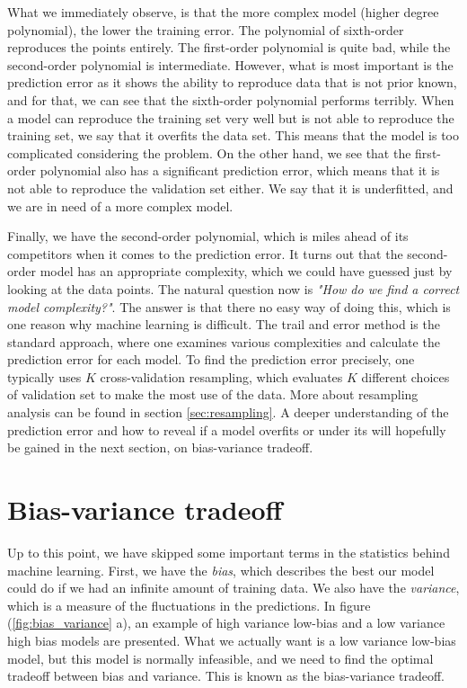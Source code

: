 What we immediately observe, is that the more complex model (higher degree polynomial), the lower the training error. The polynomial of sixth-order reproduces the points entirely. The first-order polynomial is quite bad, while the second-order polynomial is intermediate. However, what is most important is the prediction error as it shows the ability to reproduce data that is not prior known, and for that, we can see that the sixth-order polynomial performs terribly. When a model can reproduce the training set very well but is not able to reproduce the training set, we say that it overfits the data set. This means that the model is too complicated considering the problem. On the other hand, we see that the first-order polynomial also has a significant prediction error, which means that it is not able to reproduce the validation set either. We say that it is underfitted, and we are in need of a more complex model.

Finally, we have the second-order polynomial, which is miles ahead of its competitors when it comes to the prediction error. It turns out that the second-order model has an appropriate complexity, which we could have guessed just by looking at the data points. The natural question now is \textit{"How do we find a correct model complexity?"}. The answer is that there no easy way of doing this, which is one reason why machine learning is difficult. The trail and error method is the standard approach, where one examines various complexities and calculate the prediction error for each model. To find the prediction error precisely, one typically uses $K$ cross-validation resampling, which evaluates $K$ different choices of validation set to make the most use of the data. More about resampling analysis can be found in section \ref{sec:resampling}. A deeper understanding of the prediction error and how to reveal if a model overfits or under its will hopefully be gained in the next section, on bias-variance tradeoff. 

\section{Bias-variance tradeoff}
Up to this point, we have skipped some important terms in the statistics behind machine learning. First, we have the \textit{bias}, which describes the best our model could do if we had an infinite amount of training data. We also have the \textit{variance}, which is a measure of the fluctuations in the predictions. In figure (\ref{fig:bias_variance} a), an example of high variance low-bias and a low variance high bias models are presented. What we actually want is a low variance low-bias model, but this model is normally infeasible, and we need to find the optimal tradeoff between bias and variance. This is known as the bias-variance tradeoff. 

